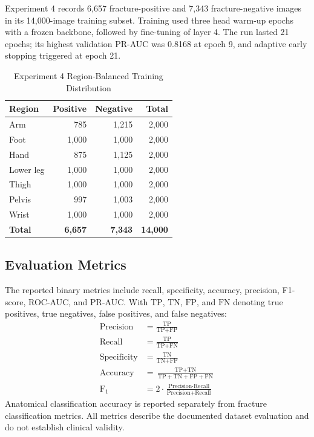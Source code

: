 \documentclass{article}
\begin{document}
Experiment 4 records 6,657 fracture-positive and 7,343 fracture-negative images in its 14,000-image training subset. Training used three head warm-up epochs with a frozen backbone, followed by fine-tuning of layer 4. The run lasted 21 epochs; its highest validation PR-AUC was 0.8168 at epoch 9, and adaptive early stopping triggered at epoch 21.

\begin{table}[htbp]
\centering
\caption{Experiment 4 Region-Balanced Training Distribution}
\label{tab:exp4_distribution}
\begin{tabular}{lrrr}
\toprule
\textbf{Region} & \textbf{Positive} & \textbf{Negative} & \textbf{Total} \\
\midrule
Arm & 785 & 1,215 & 2,000 \\
Foot & 1,000 & 1,000 & 2,000 \\
Hand & 875 & 1,125 & 2,000 \\
Lower leg & 1,000 & 1,000 & 2,000 \\
Thigh & 1,000 & 1,000 & 2,000 \\
Pelvis & 997 & 1,003 & 2,000 \\
Wrist & 1,000 & 1,000 & 2,000 \\
\midrule
\textbf{Total} & \textbf{6,657} & \textbf{7,343} & \textbf{14,000} \\
\bottomrule
\end{tabular}
\end{table}

\subsection{Evaluation Metrics}
The reported binary metrics include recall, specificity, accuracy, precision, F1-score, ROC-AUC, and PR-AUC. With $\text{TP}$, $\text{TN}$, $\text{FP}$, and $\text{FN}$ denoting true positives, true negatives, false positives, and false negatives:
\begin{align}
\text{Precision} &= \frac{\text{TP}}{\text{TP} + \text{FP}} \\
\text{Recall} &= \frac{\text{TP}}{\text{TP} + \text{FN}} \\
\text{Specificity} &= \frac{\text{TN}}{\text{TN} + \text{FP}} \\
\text{Accuracy} &= \frac{\text{TP} + \text{TN}}{\text{TP} + \text{TN} + \text{FP} + \text{FN}} \\
\text{F}_1 &= 2 \cdot \frac{\text{Precision} \cdot \text{Recall}}{\text{Precision} + \text{Recall}}
\end{align}
Anatomical classification accuracy is reported separately from fracture classification metrics. All metrics describe the documented dataset evaluation and do not establish clinical validity.
\end{document}
